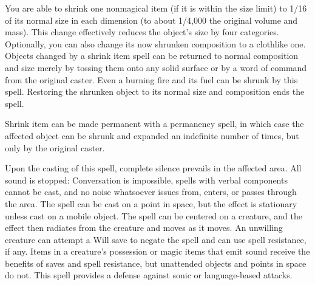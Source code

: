 \begin{multicols}{2}
\begin{small}

\noindent You are able to shrink one nonmagical item (if it is within the size limit) to 1/16 of its normal size in each dimension (to about 1/4,000 the original volume and mass). This change effectively reduces the object's size by four categories. Optionally, you can also change its now shrunken composition to a clothlike one. Objects changed by a shrink item spell can be returned to normal composition and size merely by tossing them onto any solid surface or by a word of command from the original caster. Even a burning fire and its fuel can be shrunk by this spell. Restoring the shrunken object to its normal size and composition ends the spell.

\smallskip\noindent Shrink item can be made permanent with a permanency spell, in which case the affected object can be shrunk and expanded an indefinite number of times, but only by the original caster.

\noindent Upon the casting of this spell, complete silence prevails in the affected area. All sound is stopped: Conversation is impossible, spells with verbal components cannot be cast, and no noise whatsoever issues from, enters, or passes through the area. The spell can be cast on a point in space, but the effect is stationary unless cast on a mobile object. The spell can be centered on a creature, and the effect then radiates from the creature and moves as it moves. An unwilling creature can attempt a Will save to negate the spell and can use spell resistance, if any. Items in a creature's possession or magic items that emit sound receive the benefits of saves and spell resistance, but unattended objects and points in space do not. This spell provides a defense against sonic or language-based attacks.


\end{small}
\end{multicols}
